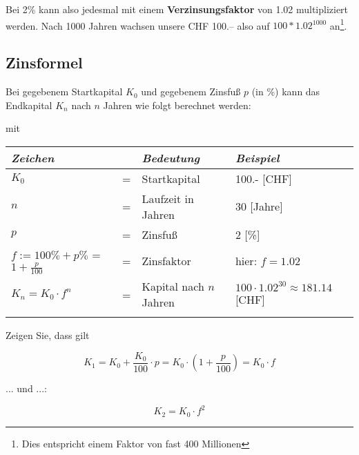 Bei 2\% kann also jedesmal mit einem \textbf{Verzinsungsfaktor} von
1.02 multipliziert werden.
Nach 1000 Jahren wachsen unsere CHF 100.-- also auf $100 *
1.02^{1000}$ an\footnote{Dies entspricht einem Faktor von fast 400 Millionen}. 
\newpage


\subsection{Zinsformel}

Bei gegebenem Startkapital $K_0$ und gegebenem Zinsfuß $p$ (in \%) kann das Endkapital $K_n$ nach $n$ Jahren wie folgt berechnet werden:

\begin{center}\end{center}

mit

\begin{center}\end{center}

\begin{tabular}{lcl|l}
  \textit{Zeichen}  & &   \textit{Bedeutung}   & \textit{Beispiel}\\%
\hline%
 $K_0$             &=&   Startkapital         & 100.-  [CHF]\\
 $n$               &=&   Laufzeit in Jahren   & 30  [Jahre]\\
 $p$               &=&   Zinsfuß              & 2  [\%]\\
 $f:= 100\% + p\%$ = $1+\frac{p}{100}$ &=&   Zinsfaktor          & hier: $f=1.02$\\
$K_n = K_0\cdot{}f^n$     &=&   Kapital nach $n$ Jahren         & $100 \cdot{} 1.02^{30}\approx{} 181.14$ [CHF]\\%
\hline\\%
\end{tabular}

Zeigen Sie, dass gilt

$$K_1 = K_0 + \frac{K_0}{100}\cdot{} p = K_0 \cdot{} \left(1+\frac{p}{100}\right) = K_0 \cdot{} f$$

... und ...:

$$K_2 = K_0 \cdot{} f^2$$



